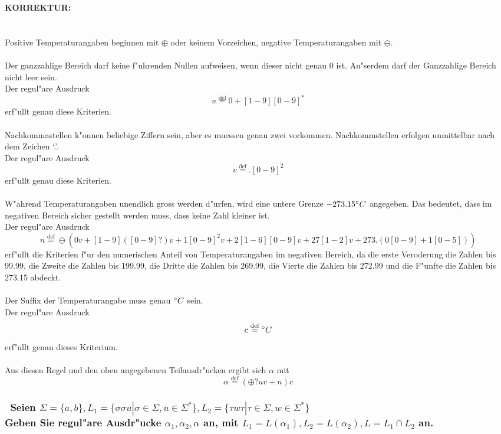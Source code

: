 \documentclass{article}
\newcommand{\gap}{\null\ \\ \\}
\newcommand{\task}[1]{\textbf{#1} \\ \gap}
\newcommand{\degr}{\null \degree}
\newcommand{\correction}{\task{KORREKTUR:}}
\newcommand{\mdef}{\overset{\text{def}}{=}}
\begin{document}
\gap
\correction
Positive Temperaturangaben beginnen mit $\oplus$ oder keinem Vorzeichen,
    negative Temperaturangaben mit $\ominus$.\\
\\
Der ganzzahlige Bereich darf keine f"uhrenden Nullen aufweisen, wenn dieser
    nicht genau 0 ist. Au"serdem darf der Ganzzahlige Bereich nicht leer sein.\\
Der regul"are Ausdruck\[
    u \mdef 0 + [1-9][0-9]^*
    \]
    erf"ullt genau diese Kriterien.\\
\\
Nachkommastellen k"onnen beliebige Ziffern sein, aber es muessen genau zwei
    vorkommen. Nachkommstellen erfolgen unmittelbar nach dem Zeichen `.'.\\
Der regul"are Ausdruck\[
        v \mdef .[0-9]^2
    \]
erf"ullt genau diese Kriterien.\\
\\
W"ahrend Temperaturangaben unendlich gross werden d"urfen, wird eine untere
    Grenze $-273.15 \degr C$ angegeben. Das bedeutet, dass im negativen Bereich
    sicher gestellt werden muss, dass keine Zahl kleiner ist.\\
    Der regul"are Ausdruck\[
        n \mdef \ominus(
            0v
            + [1-9]([0-9]?)v    %
            + 1[0-9]^2v         %
            + 2[1-6][0-9]v      %
            + 27[1-2]v          %
            + 273.(0[0-9]+1[0-5])%
            )
        \] 
    erf"ullt die Kriterien f"ur den numerischen Anteil von Temperaturangaben im 
    negativen Bereich, da die erste Veroderung die Zahlen bis 99.99, die
    Zweite die Zahlen bis 199.99, die Dritte die Zahlen bis 269.99, die Vierte
    die Zahlen bis 272.99 und die F"unfte die Zahlen bis 273.15 abdeckt.\\
\\
Der Suffix der Temperaturangabe muss genau $\degr C$ sein.\\
Der regul"are Ausdruck\[
        c \mdef \degr C
        \]
    erf"ullt genau dieses Kriterium.\\
\\
Aus diesen Regel und den oben angegebenen Teilausdr"ucken ergibt sich 
    $\alpha$ mit\[
        \alpha \mdef (\oplus ? uv + n)c
        \]

\newpage
\subsubsection{\
    Seien $\Sigma = \{a,b\} 
        , L_1 = \{\sigma\sigma u | \sigma \in \Sigma, u \in \Sigma^*\}
        , L_2 = \{\tau w \tau | \tau \in \Sigma, w \in \Sigma^*\}$\\
    Geben Sie regul"are Ausdr"ucke $\alpha_1,\alpha_2,\alpha$ an, mit
        $L_1 = L(\alpha_1), L_2 = L(\alpha_2), L = L_1 \cap L_2$ an.
    }
\end{document}
